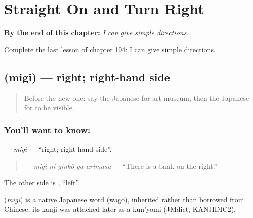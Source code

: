 
\chapter{Straight On and Turn Right}
\label{ch:ja-straight-on-and-turn-right}

\begin{chapteropening}
\textbf{By the end of this chapter:} \emph{I can give simple directions.}

Complete the last lesson of chapter 194: I can give simple directions.
\end{chapteropening}

\section[\texorpdfstring{\ja{みぎ} (migi)}{みぎ (migi)}]{ (migi) — right; right-hand side}

\label{lesson:JA-C194-migi}



\begin{quote}
Before the new one: say the Japanese for art museum, then the Japanese for to be visible.
\end{quote}

\subsection*{You'll want to know: }
\textbf{} — \emph{migi} — \textquotedblleft{}right; right-hand side\textquotedblright{}.

\begin{quote}
\textbf{  } — \emph{migi ni ginkō ga arimasu} — \textquotedblleft{}There is a bank on the right.\textquotedblright{}
\end{quote}

The other side is \textbf{}, \textquotedblleft{}left\textquotedblright{}.

\begin{cousinweb}
\textbf{} (\emph{migi}) is a native Japanese word (wago), inherited rather than borrowed from Chinese; its kanji was attached later as a kun'yomi (JMdict, KANJIDIC2).
\end{cousinweb}

